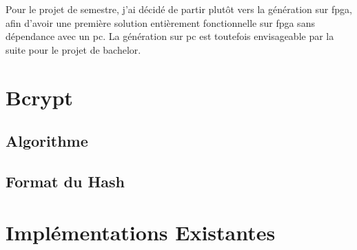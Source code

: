 Pour le projet de semestre, j'ai décidé de partir plutôt vers la génération sur \gls{fpga}, afin d'avoir une première solution entièrement fonctionnelle sur \gls{fpga} sans dépendance avec un \gls{pc}. La génération sur \gls{pc} est toutefois envisageable par la suite pour le projet de bachelor.

\section{Bcrypt}



\subsection{Algorithme}



\subsection{Format du Hash}


\section{Implémentations Existantes}